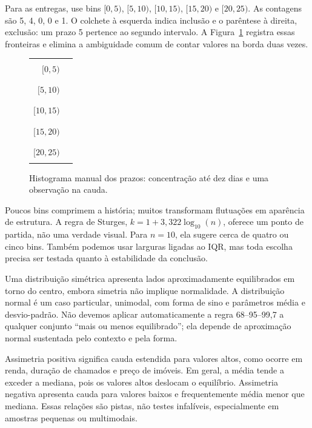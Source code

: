 Para as entregas, use bins $[0,5)$, $[5,10)$, $[10,15)$, $[15,20)$ e $[20,25)$. As contagens são 5, 4, 0, 0 e 1. O colchete à esquerda indica inclusão e o parêntese à direita, exclusão: um prazo 5 pertence ao segundo intervalo. A Figura~\ref{fig:histograma-manual} registra essas fronteiras e elimina a ambiguidade comum de contar valores na borda duas vezes.

\begin{figure}[htbp]
\centering
\small
\begin{tabular}{@{}rc@{}}
$[0,5)$   & \textcolor{guidedblueframe}{\rule{5.0cm}{0.34cm}}\quad 5 \\
$[5,10)$  & \textcolor{guidedblueframe}{\rule{4.0cm}{0.34cm}}\quad 4 \\
$[10,15)$ & \rule{0.08cm}{0.34cm}\quad 0 \\
$[15,20)$ & \rule{0.08cm}{0.34cm}\quad 0 \\
$[20,25)$ & \textcolor{guidedblueframe}{\rule{1.0cm}{0.34cm}}\quad 1 \\
\end{tabular}
\caption{Histograma manual dos prazos: concentração até dez dias e uma observação na cauda.}
\label{fig:histograma-manual}
\end{figure}

Poucos bins comprimem a história; muitos transformam flutuações em aparência de estrutura. A regra de Sturges, $k=1+3{,}322\log_{10}(n)$, oferece um ponto de partida, não uma verdade visual. Para $n=10$, ela sugere cerca de quatro ou cinco bins. Também podemos usar larguras ligadas ao IQR, mas toda escolha precisa ser testada quanto à estabilidade da conclusão.

Uma distribuição simétrica apresenta lados aproximadamente equilibrados em torno do centro, embora simetria não implique normalidade. A distribuição normal é um caso particular, unimodal, com forma de sino e parâmetros média e desvio-padrão. Não devemos aplicar automaticamente a regra 68--95--99,7 a qualquer conjunto ``mais ou menos equilibrado''; ela depende de aproximação normal sustentada pelo contexto e pela forma.

Assimetria positiva significa cauda estendida para valores altos, como ocorre em renda, duração de chamados e preço de imóveis. Em geral, a média tende a exceder a mediana, pois os valores altos deslocam o equilíbrio. Assimetria negativa apresenta cauda para valores baixos e frequentemente média menor que mediana. Essas relações são pistas, não testes infalíveis, especialmente em amostras pequenas ou multimodais.

